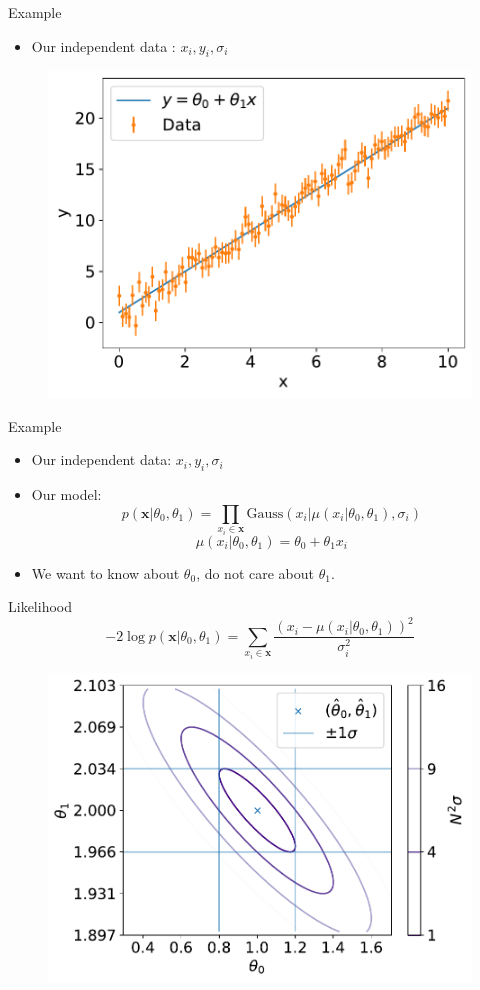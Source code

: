 \documentclass[
aspectratio=169,
14pt,
professionalfonts
]{beamer}
\newcommand{\arrow}{~\ding{220}~}
\begin{document}
\begin{frame}{Example}

    \begin{itemize}
        \item Our independent data : $x_i, y_i, \sigma_i$
    \end{itemize}

    \begin{figure}
        \centering
        \includegraphics[width=0.5\linewidth]{../plots/linear_data.pdf}
    \end{figure}

\end{frame}

\begin{frame}{Example}
    \begin{itemize}
        \item Our independent data: $x_i, y_i, \sigma_i$
        \item Our model:
        $$ p(\mathbf{x}|\theta_0, \theta_1) = \prod_{x_i \in \mathbf{x}}\text{Gauss}(x_i | \mu(x_i|\theta_0, \theta_1), \sigma_i)$$
        $$\mu(x_i|\theta_0, \theta_1) = \theta_0 + \theta_1 x_i$$
         \item[\arrow] We want to know about $\theta_0$, do not care about $\theta_1$.
    \end{itemize}
\end{frame}

\begin{frame}{Likelihood}
\vspace{-1cm}
    $$ -2\log p(\mathbf{x}|\theta_0, \theta_1) = \sum_{x_i \in \mathbf{x}}\frac{\left(x_i -\mu(x_i|\theta_0, \theta_1)\right)^2}{\sigma_i^2}$$
    \begin{figure}
        \centering
        \includegraphics[width=0.5\linewidth]{../plots/nll_unconstr.pdf}
    \end{figure}
\end{frame}
\end{document}
